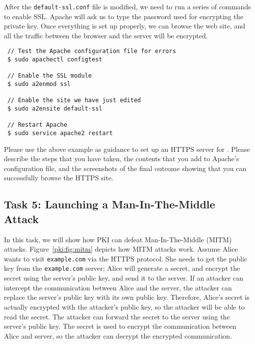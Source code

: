After the \texttt{default-ssl.conf} file is modified, we need to run a series of commands 
to enable SSL.  Apache will ask us to type the password used
for encrypting the private key.
Once everything is set up properly, we can
browse the web site, and all the traffic between the browser and the server will be encrypted.

\begin{lstlisting}
 // Test the Apache configuration file for errors
 $ sudo apachectl configtest

 // Enable the SSL module 
 $ sudo a2enmod ssl

 // Enable the site we have just edited
 $ sudo a2ensite default-ssl

 // Restart Apache
 $ sudo service apache2 restart
\end{lstlisting}
 


Please use the above example as guidance to set up an HTTPS server for 
\pkiserver. Please describe the steps that 
you have taken, the contents that you add to Apache's configuration file, and 
the screenshots of the final outcome showing that you can successfully browse
the HTTPS site. 




\subsection{Task 5: Launching a Man-In-The-Middle Attack}

In this task, we will show how PKI can defeat Man-In-The-Middle (MITM) attacks. 
Figure~\ref{pki:fig:mitm} depicts how MITM attacks work. 
Assume Alice wants to visit \texttt{example.com} via the HTTPS protocol. She 
needs to get the public key from the \texttt{example.com} server; Alice will 
generate a secret, and encrypt the secret using the server's public key,
and send it to the server. 
If an attacker can
intercept the communication between Alice and the server, the attacker 
can replace the server's public key with its own public key. Therefore, Alice's secret is
actually encrypted with the attacker's public key, so the attacker
will be able to read the secret. The attacker can forward the secret to the server using the
server's public key. The secret is used to encrypt the communication between Alice and server,  
so the attacker can decrypt the encrypted communication. 


